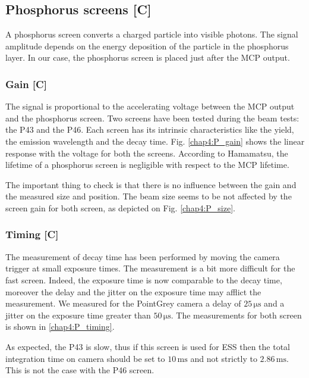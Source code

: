 \begin{refsection}
  

  \subsection{Phosphorus screens [C]}
  A phosphorus screen converts a charged particle into visible photons.
  The signal amplitude depends on the energy deposition of the particle in the phosphorus layer. In our case, the phosphorus screen is placed just after the MCP output.

  \subsubsection{Gain [C]}
  The signal is proportional to the accelerating voltage between the MCP output and the phosphorus screen. Two screens have been tested during the beam tests: the P43 and the P46. Each screen has its intrinsic characteristics like the yield, the emission wavelength and the decay time. Fig. \ref{chap4:P_gain} shows the linear response with the voltage for both the screens. According to Hamamatsu, the lifetime of a phosphorus screen is negligible with respect to the MCP lifetime.

  

  The important thing to check is that there is no influence between the gain and the measured size and position. The beam size seems to be not affected by the screen gain for both screen, as depicted on Fig. \ref{chap4:P_size}.

  

  \subsubsection{Timing [C]}
  The measurement of decay time has been performed by moving the camera trigger at small exposure times. The measurement is a bit more difficult for the fast screen. Indeed, the exposure time is now comparable to the decay time, moreover the delay and the jitter on the exposure time may afflict the measurement.
  We measured for the PointGrey camera a delay of $25\,\mathrm{\mu s}$ and a jitter on the exposure time greater than $50\,\mathrm{\mu s}$. The measurements for both screen is shown in \ref{chap4:P_timing}.

  

  As expected, the P43 is slow, thus if this screen is used for ESS then the total integration time on camera should be set to $10\,\mathrm{ms}$ and not strictly to $2.86\,\mathrm{ms}$. This is not the case with the P46 screen.


\end{refsection}
